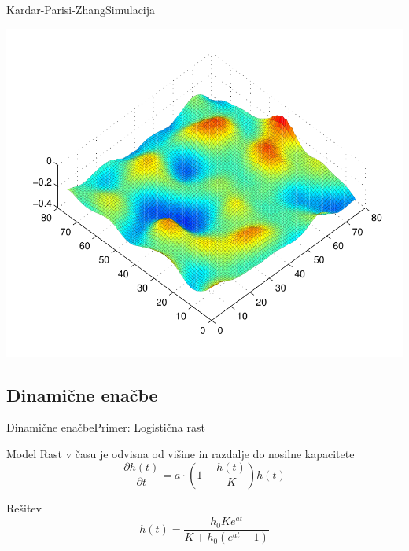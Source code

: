 \documentclass{beamer}
\begin{document}
\begin{frame}{Kardar-Parisi-Zhang}{Simulacija}
\begin{center}
  \includegraphics[width=.95\textwidth]{slike/KPZ-numericno}
\end{center}
\end{frame}


\subsection{Dinamične enačbe}

\begin{frame}{Dinamične enačbe}{Primer: Logistična rast}
\begin{block}{Model}
  Rast v času je odvisna od višine in razdalje do nosilne kapacitete
  \begin{equation} \frac{\partial h(t)}{\partial t} = a \cdot \left( 1 - \frac{h(t)}{K} \right) h(t) \end{equation}
\end{block}
\begin{block}{Rešitev}
  \begin{equation} h(t) = \frac{h_0 K e^{a t}}{K + h_0 (e^{a t}-1)} \end{equation}
\end{block}
\end{frame}
\end{document}
